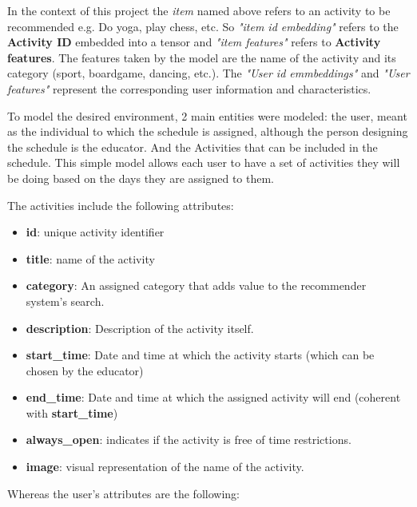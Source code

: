 \documentclass[10pt,twocolumn,letterpaper]{article}
\begin{document}
In the context of this project the \textit{item} named above refers to an activity to be recommended e.g. Do yoga, play chess, etc. So \textit{"item id embedding"} refers to the \textbf{Activity ID} embedded into a tensor and  \textit{"item features"} refers to \textbf{Activity features}. The features taken by the model are the name of the activity and its category (sport, boardgame, dancing, etc.). The \textit{"User id emmbeddings"} and \textit{"User features"} represent the corresponding user information and characteristics. 

To model the desired environment, 2 main entities were modeled: the user, meant as the individual to which the schedule is assigned, although the person designing the schedule is the educator. And the Activities that can be included in the schedule. This simple model allows each user to have a set of activities they will be doing based on the days they are assigned to them. 

The activities include the following attributes:

\begin{itemize}

    \item \textbf{id}: unique activity identifier

    \item \textbf{title}: name of the activity

    \item \textbf{category}: An assigned category that adds value to the recommender system's search.

    \item \textbf{description}: Description of the activity itself.

    \item \textbf{start\_time}: Date and time at which the activity starts (which can be chosen by the educator)

    \item \textbf{end\_time}: Date and time at which the assigned activity will end (coherent with \textbf{start\_time})

    \item \textbf{always\_open}: indicates if the activity is free of time restrictions.

    \item \textbf{image}: visual representation of the name of the activity.
    
\end{itemize}

Whereas the user's attributes are the following:
\end{document}
